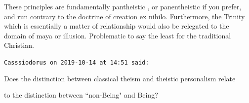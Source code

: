 \begin{footnotesize}
\begin{sffamily}
These principles are fundamentally pantheistic , or panentheistic if you prefer, and run contrary to the doctrine of
creation ex nihilo. Furthermore, the Trinity which is essentially a matter of relationship would also be relegated to
the domain of maya or illusion. Problematic to say the least for the traditional Christian.


\hfill

\texttt{Casssiodorus on 2019-10-14 at 14:51 said: }

Does the distinction between classical theism and theistic personalism relate

to the distinction between ``non-Being" and Being?


\hfill


\end{sffamily}\end{footnotesize}
